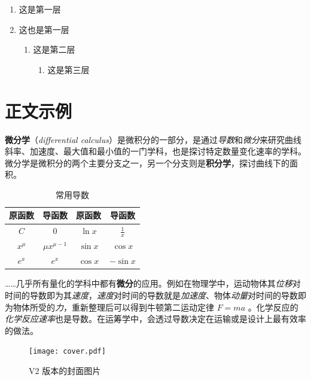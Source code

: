 \documentclass[
  xits = false,
  10pt,
  twoside,
  openany,
  b5paper, %
  colorscheme = basic %
]{qyxf-book}
\begin{document}
\begin{enumerate}
  \item 这是第一层
  \item 这也是第一层
  \begin{enumerate}
    \item 这是第二层
    \begin{enumerate}
      \item 这是第三层
    \end{enumerate}
  \end{enumerate}
\end{enumerate}

\section{正文示例}

\textbf{微分学}（\emph{differential calculus}）是微积分的一部分，是通过\emph{导数}和\emph{微分}来研究曲线斜率、加速度、最大值和最小值的一门学科，也是探讨特定数量变化速率的学科。微分学是微积分的两个主要分支之一，另一个分支则是\textbf{积分学}，探讨曲线下的面积。


\begin{table}[htbp]
  \centering
  \caption{常用导数}
  \begin{tabular}{cccc}
    \toprule
    \textbf{原函数} & \textbf{导函数}   & \textbf{原函数} & \textbf{导函数} \\
    \midrule
    $C$             & $0$               & $\ln x$         & $\frac{1}{x}$   \\
    $x^\mu$         & $\mu x^{\mu - 1}$ & $\sin x$        & $\cos x$        \\
    $e^x$           & $e^x$             & $\cos x$        & $-\sin x$       \\
    \bottomrule
  \end{tabular}
\end{table}

……几乎所有量化的学科中都有\textbf{微分}的应用。例如在物理学中，运动物体其\emph{位移}对时间的导数即为其\emph{速度}，\emph{速度}对时间的导数就是\emph{加速度}、物体\emph{动量}对时间的导数即为物体所受的\emph{力}，重新整理后可以得到牛顿第二运动定律 $F=ma$ 。化学反应的\emph{化学反应速率}也是导数。在运筹学中，会透过导数决定在运输或是设计上最有效率的做法。

\begin{figure}[htbp]
  \centering
  \texttt{[image: cover.pdf]}
  \caption{V2 版本的封面图片}
  \label{fig:qyxf-logo}
\end{figure}
\end{document}
